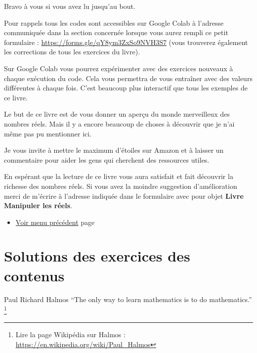 \documentclass[a4paper,11pt]{book}
\begin{document}
\clearpage

Bravo à vous si vous avez lu jusqu'au bout.

Pour rappels tous les codes sont accessibles sur Google Colab à
l'adresse communiquée dans la section concernée lorsque vous
aurez rempli ce petit formulaire : \url{https://forms.gle/qY8ym3ZxSo9NVH3S7}
(vous trouverez également les corrections de tous les exercices du
livre).

Sur Google Colab vous pourrez expérimenter avec des exercices
nouveaux à chaque exécution du code. Cela vous permettra de vous
entraîner avec des valeurs différentes à chaque fois. C'est beaucoup
plus interactif que tous les exemples de ce livre.

Le but de ce livre est de vous donner un aperçu du monde merveilleux
des nombres réels. Mais il y a encore beaucoup de choses à découvrir
que je n'ai même pas pu mentionner ici.

Je vous invite à mettre le maximum d'étoiles sur Amazon et à laisser
un commentaire pour aider les gens qui cherchent des ressources utiles.

En espérant que la lecture de ce livre vous aura satisfait et fait
découvrir la richesse des nombres réels. Si vous avez la moindre
suggestion d'amélioration merci de m'écrire à l'adresse
indiquée dans le formulaire avec pour objet \textbf{Livre Manipuler les
réels}.

\begin{itemize}
\item \hyperref[org71f8d0a]{Voir menu précédent}
page~\pageref{page:after-menu}
\end{itemize}

\clearpage

\part{Solutions des exercices des contenus}
\label{sec:org3ec29c0}
\label{orge8af971}
\label{page:sec8sols-contents}

\begin{myquote}{Paul Richard Halmos}
\enquote{The only way to learn mathematics is to do mathematics.}
\footnote{Lire la page Wikipédia sur Halmos : \url{https://en.wikipedia.org/wiki/Paul_Halmos}}
\end{myquote}


\clearpage
\end{document}
